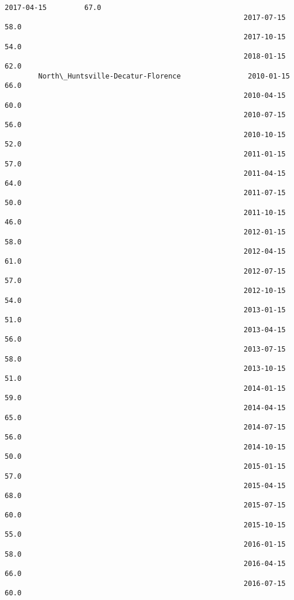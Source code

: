 \documentclass[11pt]{article}
\begin{document}
\begin{Verbatim}[commandchars=\\\{\}]
                                                         2017-04-15         67.0   
                                                         2017-07-15         58.0   
                                                         2017-10-15         54.0   
                                                         2018-01-15         62.0   
        North\_Huntsville-Decatur-Florence                2010-01-15         66.0   
                                                         2010-04-15         60.0   
                                                         2010-07-15         56.0   
                                                         2010-10-15         52.0   
                                                         2011-01-15         57.0   
                                                         2011-04-15         64.0   
                                                         2011-07-15         50.0   
                                                         2011-10-15         46.0   
                                                         2012-01-15         58.0   
                                                         2012-04-15         61.0   
                                                         2012-07-15         57.0   
                                                         2012-10-15         54.0   
                                                         2013-01-15         51.0   
                                                         2013-04-15         56.0   
                                                         2013-07-15         58.0   
                                                         2013-10-15         51.0   
                                                         2014-01-15         59.0   
                                                         2014-04-15         65.0   
                                                         2014-07-15         56.0   
                                                         2014-10-15         50.0   
                                                         2015-01-15         57.0   
                                                         2015-04-15         68.0   
                                                         2015-07-15         60.0   
                                                         2015-10-15         55.0   
                                                         2016-01-15         58.0   
                                                         2016-04-15         66.0   
                                                         2016-07-15         60.0   

\end{Verbatim}
\end{document}
